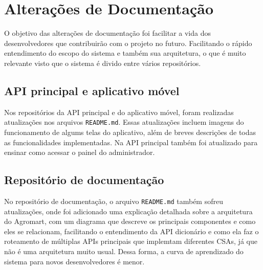 \chapter{Alterações de Documentação}
O objetivo das alterações de documentação foi facilitar a vida dos desenvolvedores que contribuirão com o projeto no futuro. Facilitando o rápido entendimento do escopo do sistema e também sua arquitetura, o que é muito relevante visto que o sistema é divido entre vários repositórios.

\section{API principal e aplicativo móvel}
Nos repositórios da API principal e do aplicativo móvel, foram realizadas atualizações nos arquivos \texttt{README.md}. Essas atualizações incluem imagens do funcionamento de algums telas do aplicativo, além de breves descrições de todas as funcionalidades implementadas. Na API principal também foi atualizado para ensinar como acessar o painel do administrador. 

\section{Repositório de documentação}
No repositório de documentação, o arquivo \texttt{README.md} também sofreu atualizações, onde foi adicionado uma explicação detalhada sobre a arquitetura do Agromart, com um diagrama que descreve os principais componentes e como eles se relacionam, facilitando o entendimento da API dicionário e como ela faz o roteamento de múltiplas APIs principais que implemtam diferentes CSAs, já que não é uma arquitetura muito usual. Dessa forma, a curva de aprendizado do sistema para novos desenvolvedores é menor.

